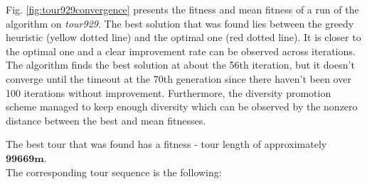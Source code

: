 \documentclass[a4paper,10pt]{article}
\begin{document}
Fig. \ref{fig:tour929convergence} presents the fitness and mean fitness of a run of the algorithm on \textit{tour929}. The best solution that was found lies between the greedy heuristic (yellow dotted line) and the optimal one (red dotted line). It is closer to the optimal one and a clear improvement rate can be observed across iterations. The algorithm finds the best solution at about the 56th iteration, but it doesn't converge until the timeout at the 70th generation since there haven't been over 100 iterations without improvement. Furthermore, the diversity promotion scheme managed to keep enough diversity which can be observed by the nonzero distance between the best and mean fitnesses.


The best tour that was found has a fitness - tour length of approximately $\textbf{99669m}$.\\
The corresponding tour sequence is the following:
\end{document}

